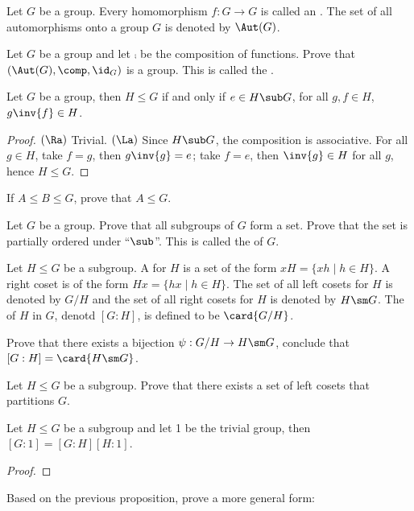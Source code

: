 \documentclass[10pt]{article}
\begin{document}
\begin{definition}
    Let $G$ be a group. Every homomorphism $f:G\to G$ is called an . The set of all automorphisms onto a group $G$ is denoted by $\Aut(G)$.
\end{definition}
\begin{problem}
    Let $G$ be a group and let $\comp$ be the composition of functions. Prove that $(\Aut(G),\comp,{\id}_{G})$ is a group. This is called the .
\end{problem}
\begin{proposition}
    Let $G$ be a group, then $H\le G$ if and only if $e\in H\sub G$, for all $g,f\in H$, $g\inv{f}\in H$. 
\end{proposition}
\begin{proof}
    $(\Ra)$ Trivial. $(\La)$ Since $H\sub G$, the composition is associative. For all $g\in H$, take $f=g$, then $g\inv{g}=e$; take $f=e$, then $\inv{g}\in H$ for all $g$, hence $H\le G$.
\end{proof}
\begin{problem}
    If $A\le B\le G$, prove that $A\le G$.
\end{problem}
\begin{problem}
    Let $G$ be a group. Prove that all subgroups of $G$ form a set. Prove that the set is partially ordered under ``$\sub$''. This is called the  of $G$.
\end{problem}
\begin{definition}
    Let $H\le G$ be a subgroup. A  for $H$ is a set of the form $xH=\{xh\mid h\in H\}$. A right coset is of the form $Hx=\{hx\mid h\in H\}$. The set of all left cosets for $H$ is denoted by $G/H$ and the set of all right cosets for $H$ is denoted by $H\sm G$. The  of $H$ in $G$, denotd $[G:H]$, is defined to be $\card{G/H}$.
\end{definition}
\begin{problem}
    Prove that there exists a bijection $\psi:G/H\to H\sm G$, conclude that $[G:H]=\card{H\sm G}$.
\end{problem}
\begin{problem}
    Let $H\le G$ be a subgroup. Prove that there exists a set of left cosets that partitions $G$.
\end{problem}
\begin{proposition}
    Let $H\le G$ be a subgroup and let 1 be the trivial group, then $[G:1]=[G:H][H:1]$.
\end{proposition}
\begin{proof}
    
\end{proof}
\begin{problem}
    Based on the previous proposition, prove a more general form: 
\end{problem}
\end{document}

